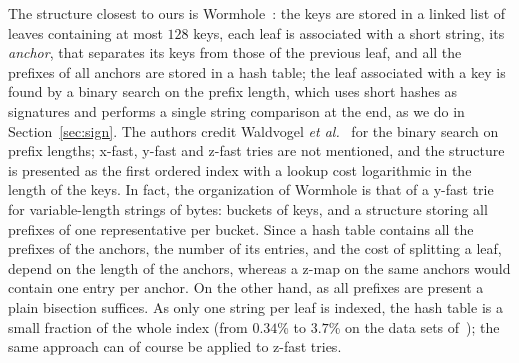 \documentclass[a4paper]{article}
\newcommand{\?}{\mskip1.5mu}
\begin{document}
The structure closest to ours is Wormhole~\cite{WNJWormhole}: the keys are stored in a linked list of leaves containing at most $128$ keys, 
each leaf is associated with a short string, its \emph{anchor}, that separates its keys from those of the previous leaf, 
and all the prefixes of all anchors are stored in a hash table; the leaf associated with a key is found by a binary search on the prefix length, 
which uses short hashes as signatures and performs a single string comparison at the end, as we do in Section~\ref{sec:sign}. 
The authors credit Waldvogel \textit{et al.}~\cite{Waldvogel1997Scalable} for the binary search on prefix lengths; x-fast, y-fast and z-fast tries are not mentioned, 
and the structure is presented as the first ordered index with a lookup cost logarithmic in the length of the keys. 
In fact, the organization of Wormhole is that of a y-fast trie for variable-length strings of bytes: buckets of keys, 
and a structure storing all prefixes of one representative per bucket. 
Since a hash table contains all the prefixes of the anchors, the number of its entries, and the cost of splitting a leaf, depend on the 
length of the anchors, whereas a z-map on the same anchors would contain one entry per anchor. On the other hand, as all prefixes are present 
a plain bisection suffices. As only one string per leaf is indexed, the hash table is a small fraction of the whole index (from $0.34$\% to $3.7$\% on the data sets of~\cite{WNJWormhole}); 
the same approach can of course be applied to z-fast tries. 
\end{document}
